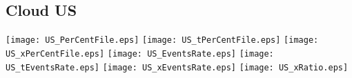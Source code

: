\subsection{Cloud US}
\texttt{[image: US\_PerCentFile.eps]}
\texttt{[image: US\_tPerCentFile.eps]}
\texttt{[image: US\_xPerCentFile.eps]}
\texttt{[image: US\_EventsRate.eps]}
\texttt{[image: US\_tEventsRate.eps]}
\texttt{[image: US\_xEventsRate.eps]}
\texttt{[image: US\_xRatio.eps]}
\vspace{1ex}\\

